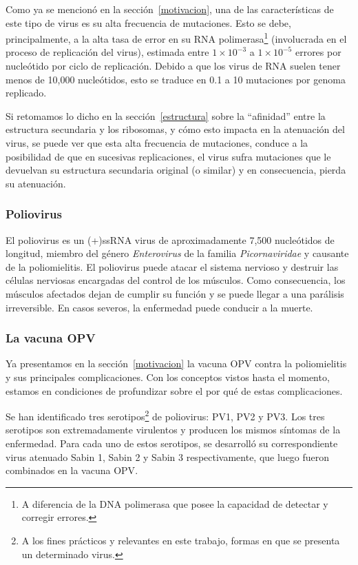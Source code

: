 Como ya se mencion\'o en la secci\'on~\ref{motivacion}, una de las
caracter\'isticas de este tipo de virus es su alta frecuencia de mutaciones.
Esto se debe, principalmente, a la alta tasa de error en su \ac{RNA}
polimerasa\footnote{A diferencia de la \ac{DNA} polimerasa que posee la
capacidad de detectar y corregir errores.} (involucrada en el proceso de
replicaci\'on del virus), estimada entre $1\times10^{-3}$ a $1\times10^{-5}$
errores por nucle\'otido por ciclo de replicaci\'on\cite{Vignuzzi08}. Debido a
que los virus de \ac{RNA} suelen tener menos de 10,000 nucle\'otidos, esto se
traduce en 0.1 a 10 mutaciones por genoma replicado.

Si retomamos lo dicho en la secci\'on~\ref{estructura} sobre la ``afinidad''
entre la estructura secundaria y los ribosomas, y c\'omo esto impacta en la
atenuaci\'on del virus, se puede ver que esta alta frecuencia de mutaciones,
conduce a la posibilidad de que en sucesivas replicaciones, el virus sufra
mutaciones que le devuelvan su estructura secundaria original (o similar) y en
consecuencia, pierda su atenuaci\'on.

\subsubsection{Poliovirus}

El poliovirus es un \ac{(+)ssRNA virus} de aproximadamente 7,500 nucle\'otidos
de longitud, miembro del g\'enero \textit{Enterovirus} de la familia
\textit{Picornaviridae} y causante de la poliomielitis. El poliovirus puede
atacar el sistema nervioso y destruir las c\'elulas nerviosas encargadas del
control de los m\'usculos. Como consecuencia, los m\'usculos afectados dejan de
cumplir su funci\'on y se puede llegar a una par\'alisis irreversible. En casos
severos, la enfermedad puede conducir a la muerte.

\subsubsection{La vacuna \ac{OPV}}

Ya presentamos en la secci\'on~\ref{motivacion} la vacuna \ac{OPV} contra la
poliomielitis y sus principales complicaciones. Con los conceptos vistos
hasta el momento, estamos en condiciones de profundizar sobre el por qu\'e de
estas complicaciones.

Se han identificado tres serotipos\footnote{A los fines pr\'acticos y relevantes
en este trabajo, formas en que se presenta un determinado virus.} de poliovirus:
\ac{PV1}, \ac{PV2} y \ac{PV3}. Los tres serotipos son extremadamente virulentos
y producen los mismos s\'intomas de la enfermedad. Para cada uno de estos
serotipos, se desarroll\'o  su correspondiente virus atenuado Sabin 1, Sabin 2 y
Sabin 3 respectivamente, que luego fueron combinados en la vacuna \ac{OPV}.

